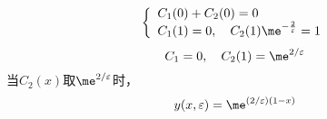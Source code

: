\documentclass[12pt]{article}
\begin{document}
\begin{equation}
	\left\{
	\begin{array}{lll}
	C_1(0) + C_2(0) = 0\\
	C_1(1) = 0,\quad C_2(1)\me^{-\frac{2}{\varepsilon}} = 1
	\end{array}
	\right.
\end{equation}
\begin{equation}
	C_1 = 0,\quad C_2(1) = \me^{2/\varepsilon}
\end{equation}
当$C_2(x) $取$\me^{2/\varepsilon}$时，
\begin{equation}
	y(x,\varepsilon) = \me^{(2/\varepsilon)(1-x)}
\end{equation}





\nocite{*}


\end{document}
